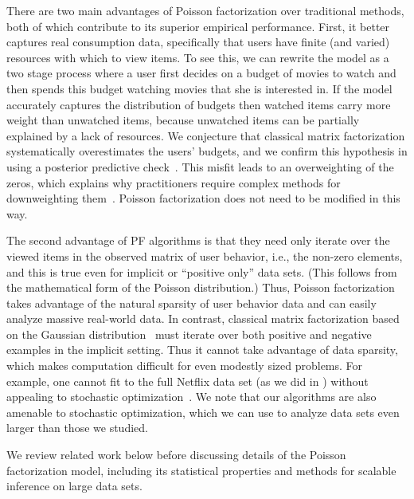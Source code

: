 
There are two main advantages of Poisson factorization over
traditional methods, both of which contribute to its superior
empirical performance.  First, it better captures real consumption
data, specifically that users have finite (and varied) resources with
which to view items.  To see this, we can rewrite the model as a two
stage process where a user first decides on a budget of movies to
watch and then spends this budget watching movies that she is
interested in.  If the model accurately captures the distribution of
budgets then watched items carry more weight than unwatched items,
because unwatched items can be partially explained by a lack of
resources. We conjecture that classical matrix factorization
systematically overestimates the users' budgets, and we confirm this
hypothesis in  using a posterior predictive
check~\cite{Gelman:1996}.  This misfit leads to an overweighting of
the zeros, which explains why practitioners require complex methods
for downweighting
them~\cite{Hu:2008p9402,Gantner:2012p9364,Dror:2012a,Paquet:2013p9197}.
Poisson factorization does not need to be modified in this way.

The second advantage of PF algorithms is that they need only iterate
over the viewed items in the observed matrix of user behavior, i.e.,
the non-zero elements, and this is true even for implicit or
``positive only'' data sets.  (This follows from the mathematical form
of the Poisson distribution.)  Thus, Poisson factorization takes
advantage of the natural sparsity of user behavior data and can easily
analyze massive real-world data. In contrast, classical matrix
factorization based on the Gaussian
distribution~\cite{Salakhutdinov:2008} must iterate over both positive
and negative examples in the implicit setting. Thus it cannot take
advantage of data sparsity, which makes computation difficult for even
modestly sized problems.  For example, one cannot fit to the full
Netflix data set (as we did in ) without appealing to
stochastic optimization~\cite{Mairal:2010}.  We note that our
algorithms are also amenable to stochastic optimization, which we can
use to analyze data sets even larger than those we studied.


We review related work below before discussing details of the Poisson
factorization model, including its statistical properties and methods
for scalable inference on large data sets.


